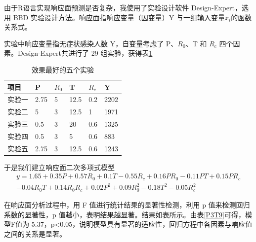 \documentclass[a4paper, 11pt,twoside=true,UTF8]{scrartcl}
\begin{document}
由于R语言实现响应面预测是否复杂，我使用了实验设计软件 Design-Expert，选用 BBD 实验设计方法。响应面指响应变量（因变量）Y 与一组输入变量$x_i$的函数关系式。

实验中响应变量指无症状感染人数 Y，自变量考虑了 P、$R_0$、T 和 $R_c$ 四个因素。Design-Expert共进行了 29 组实验，获得表\ref{P3T8}
\vspace{-0.5cm}
\begin{table}[H]
	\centering
	\caption{效果最好的五个实验} \label{P3T8}
	\begin{tabular}{llllll}
		\hline
		\textbf{项目} & \textbf{P} & \textbf{$R_0$} & \textbf{T} & \textbf{$R_c$} & \textbf{Y} \\ \hline
		实验一         & 2.75       & 5              & 12.5       & 0.2            & 2202       \\
		实验二         & 5          & 3              & 12.5       & 1              & 1971       \\
		实验三         & 0.5        & 3              & 20         & 0.6            & 1325       \\
		实验四         & 0.5        & 3              & 5          & 0.6            & 883        \\
		实验五         & 2.75       & 3              & 12.5       & 0.6            & 1243
		\\ \hline
	\end{tabular}
\end{table}

于是我们建立响应面二次多项式模型
$$
\begin{aligned}
y=1.65+0.35P+0.57R_0+0.1T-0.55R_c+0.16PR_0-0.11PT+0.15PR_c \\
-0.04R_0T+0.14R_0R_c+0.02P^2+0.09R_0^2-0.18T^2-0.05R_c^2
\end{aligned}
$$

在响应面分析过程中，用 F 值进行统计结果的显著性检测，利用 p 值来检测回归系数的显著性，p 值越小，表明结果越显著。结果如表所示。由表\ref{P3T9}可得，模型F值为 5.37，p<0.05，说明模型具有显著的适应性，回归方程中各因素与响应值之间的关系是显著。
\end{document}
